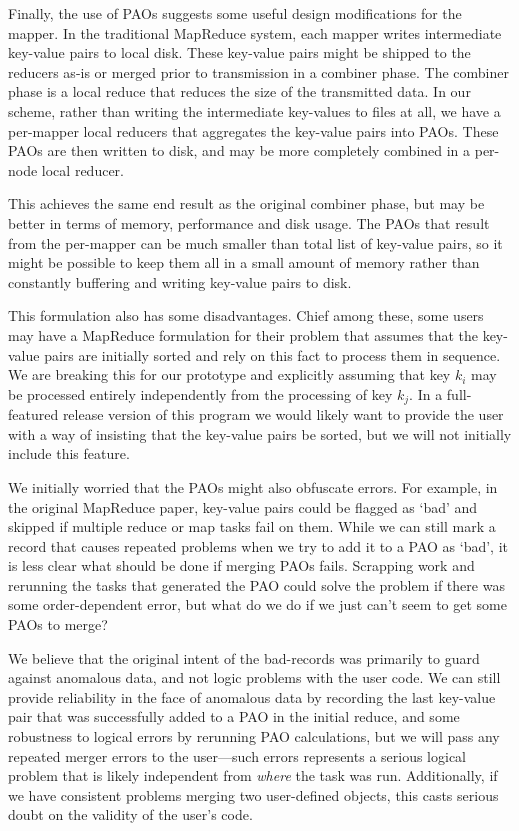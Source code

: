 \documentclass[10pt,letter,final,article,twocolumn]{article} %
\begin{document}
Finally, the use of PAOs suggests some useful design modifications for the mapper. In the traditional MapReduce system, each mapper writes intermediate key-value pairs to local disk. These key-value pairs might be shipped to the reducers as-is or merged prior to transmission in a combiner phase. The combiner phase is a local reduce that reduces the size of the transmitted data. In our scheme, rather than writing the intermediate key-values to files at all, we have a per-mapper local reducers that aggregates the key-value pairs into PAOs. These PAOs are then written to disk, and may be more completely combined in a per-node local reducer. 

This achieves the same end result as the original combiner phase, but may be better in terms of memory, performance and disk usage. The PAOs that result from the per-mapper can be much smaller than total list of key-value pairs, so it might be possible to keep them all in a small amount of memory rather than constantly buffering and writing key-value pairs to disk.

This formulation also has some disadvantages. Chief among these, some users may have a MapReduce formulation for their problem that assumes that the key-value pairs are initially sorted and rely on this fact to process them in sequence. We are breaking this for our prototype and explicitly assuming that key $k_i$ may be processed entirely independently from the processing of key $k_j$. In a full-featured release version of this program we would likely want to provide the user with a way of insisting that the key-value pairs be sorted, but we will not initially include this feature.

We initially worried that the PAOs might also obfuscate errors. For example, in the original MapReduce paper, key-value pairs could be flagged as `bad' and skipped if multiple reduce or map tasks fail on them. While we can still mark a record that causes repeated problems when we try to add it to a PAO as `bad', it is less clear what should be done if merging PAOs fails. Scrapping work and rerunning the tasks that generated the PAO could solve the problem if there was some order-dependent error, but what do we do if we just can't seem to get some PAOs to merge?

We believe that  the original intent of the bad-records was primarily to guard against anomalous data, and not logic problems with the user code. We can still provide reliability in the face of anomalous data by recording the last key-value pair that was successfully added to a PAO in the initial reduce, and some robustness to logical errors by rerunning PAO calculations, but we will  pass any repeated merger errors to the user---such errors represents a serious logical problem that is likely independent from \emph{where} the task was run. Additionally, if we have consistent problems merging two user-defined objects, this casts serious doubt on the validity of the user's code.
\end{document}
